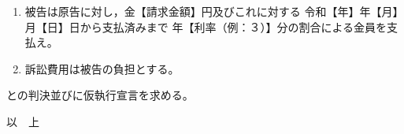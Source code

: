 \documentclass{ltjsarticle}
\begin{document}


\begin{enumerate}
  \item 被告は原告に対し，金【請求金額】円及びこれに対する
        令和【年】年【月】月【日】日から支払済みまで
        年【利率（例：３）】分の割合による金員を支払え。
  \item 訴訟費用は被告の負担とする。
\end{enumerate}

との判決並びに仮執行宣言を求める。

\vspace{2\zw}

\begin{flushright}
以　上
\end{flushright}
\end{document}

